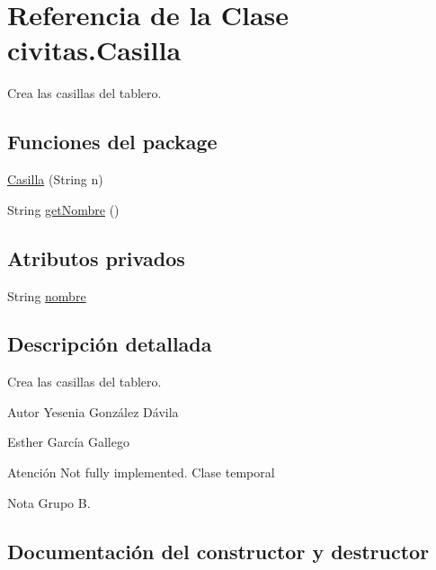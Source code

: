 \hypertarget{classcivitas_1_1Casilla}{}\section{Referencia de la Clase civitas.\+Casilla}
\label{classcivitas_1_1Casilla}


Crea las casillas del tablero.  


\subsection*{Funciones del \textquotesingle{}package\textquotesingle{}}
\begin{DoxyCompactItemize}
\item 
\hyperlink{classcivitas_1_1Casilla_a7a9a4c3d9d8983a778d6277b81472bad}{Casilla} (String n)
\item 
String \hyperlink{classcivitas_1_1Casilla_aeff56538b363f5ca69221cf0b0743d37}{get\+Nombre} ()
\end{DoxyCompactItemize}
\subsection*{Atributos privados}
\begin{DoxyCompactItemize}
\item 
String \hyperlink{classcivitas_1_1Casilla_a0c92d713bf425d120f6952bb5db1f643}{nombre}
\end{DoxyCompactItemize}


\subsection{Descripción detallada}
Crea las casillas del tablero. 

\begin{DoxyAuthor}{Autor}
Yesenia González Dávila 

Esther García Gallego
\end{DoxyAuthor}
\begin{DoxyWarning}{Atención}
Not fully implemented. Clase temporal 
\end{DoxyWarning}
\begin{DoxyNote}{Nota}
Grupo B. 
\end{DoxyNote}


\subsection{Documentación del constructor y destructor}
\mbox{\label{classcivitas_1_1Casilla_a7a9a4c3d9d8983a778d6277b81472bad}} 
